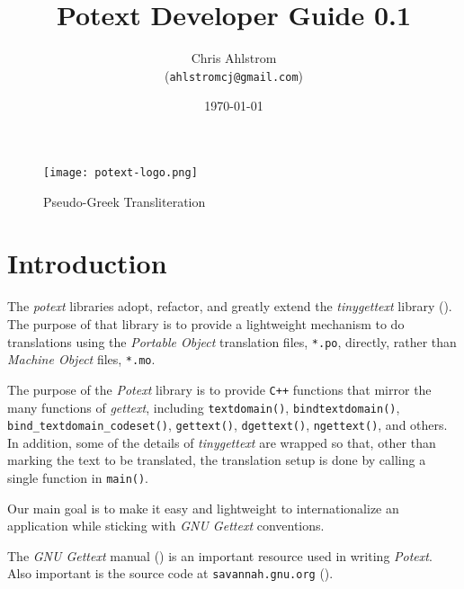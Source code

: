 \documentclass[
 11pt,
 twoside,
 a4paper,
 final                                 %
]{article}
\begin{document}
\title{Potext Developer Guide 0.1}
\author{Chris Ahlstrom \\
   (\texttt{ahlstromcj@gmail.com})}
\date{\today}
\maketitle

\begin{figure}[H]
   \centering 
   \texttt{[image: potext-logo.png]}
   \caption*{Pseudo-Greek Transliteration}
\end{figure}

\clearpage                             %

\tableofcontents
\listoffigures                         %

%

\parindent 0pt
\parskip 9pt

\rhead{\rightmark}         %

\section{Introduction}
\label{sec:introduction}

   The \textsl{potext} libraries adopt, refactor, and greatly extend the
   \textsl{tinygettext} library (\cite{tinygettext}).
   The purpose of that library is to provide a lightweight mechanism
   to do translations using the
   \textsl{Portable Object} translation files, \texttt{*.po}, directly,
   rather than \textsl{Machine Object} files, \texttt{*.mo}.

   The purpose of the \textsl{Potext} library is to provide \texttt{C++}
   functions that mirror the many functions of \textsl{gettext},
   including 
   \texttt{textdomain()},
   \texttt{bindtextdomain()},
   \texttt{bind\_textdomain\_codeset()},
   \texttt{gettext()},
   \texttt{dgettext()},
   \texttt{ngettext()},
   and others.
   In addition, some of the details of \textsl{tinygettext} 
   are wrapped so that, other than marking the text to be translated,
   the translation setup is done by calling a single function in
   \texttt{main()}.

   Our main goal is to make it easy and lightweight to internationalize
   an application while sticking with \textsl{GNU Gettext}
   conventions.

   The \textsl{GNU Gettext} manual (\cite{gettextman}) is an important
   resource used in writing \textsl{Potext}.
   Also important is the source code at
   \texttt{savannah.gnu.org} (\cite{gettextcode}).
\end{document}

